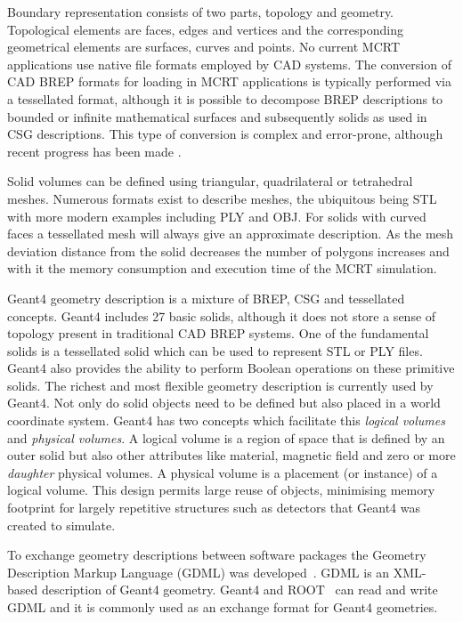 \documentclass[final,5p,times,twocolumn]{elsarticle}
\begin{document}
Boundary representation consists of two parts, topology and geometry. Topological elements are faces, edges and vertices and the corresponding
geometrical elements are surfaces, curves and points. No current MCRT applications use native file formats employed by CAD systems. The conversion of 
CAD BREP formats for loading in MCRT applications is typically performed via a tessellated format, although it is possible to decompose BREP descriptions
 to bounded or infinite mathematical surfaces and subsequently solids as used in CSG descriptions. This type of conversion is complex and error-prone, 
 although recent progress has been made \cite{WangNuclSciTech31-82-2020}.

Solid volumes can be defined using triangular, quadrilateral or tetrahedral meshes. Numerous formats exist to describe meshes, the ubiquitous being STL with
more modern examples including PLY and OBJ. For solids with curved faces a tessellated mesh will always give an approximate description. As the mesh 
deviation distance from the solid decreases the number of polygons increases and with it the memory consumption and execution time of the MCRT simulation. 

Geant4 geometry description is a mixture of BREP, CSG and tessellated concepts. Geant4 includes 27 basic solids, although it does not store a sense 
of topology present in traditional CAD BREP systems. One of the fundamental solids is a tessellated solid which can be used to represent STL or PLY files. 
Geant4 also provides the ability to perform Boolean operations on these primitive solids. The richest and most flexible geometry description is currently used by
Geant4. Not only do solid objects need to be defined but also placed in a world coordinate system. Geant4 has two concepts which facilitate this \emph{logical volumes}
and \emph{physical volumes}. A logical volume is a region of space that is defined by an outer solid but also other attributes like material, magnetic field 
and zero or more \emph{daughter} physical volumes. A physical volume is a placement (or instance) of a logical volume. This design permits large reuse 
of objects, minimising memory footprint for largely repetitive structures such as detectors that Geant4 was created to simulate.  


To exchange geometry descriptions between software packages the Geometry Description Markup Language (GDML) was developed~\cite{GDML}. 
GDML is an XML-based description of Geant4 geometry. Geant4 and ROOT~\cite{fons_rademakers_2019_3895860} can read and write 
GDML and it is commonly used as an exchange format for Geant4 geometries. 
\end{document}
